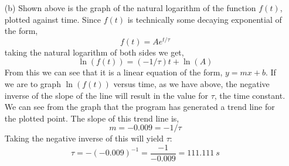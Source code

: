 \documentclass[12pt]{article}
\begin{document}
    \begin{itemize}
        \item[(b)]
            Shown above is the graph of the natural logarithm of the function $f(t)$, plotted against time. Since $f(t)$ is technically some decaying exponential of the form,
            \[
                f(t) = A e^{t / \tau}
            \]
            taking the natural logarithm of both sides we get,
            \[
                \ln(f(t)) = (-1 / \tau) t + \ln(A)
            \]
            From this we can see that it is a linear equation of the form, $y = mx + b$. If we are to graph $\ln(f(t))$ versus time, as we have above, the negative inverse of the slope of the line will result in the value for $\tau$, the time constant. We can see from the graph that the program has generated a trend line for the plotted point.  The slope of this trend line is,
            \[
                m = -0.009 = -1 / \tau
            \]
            Taking the negative inverse of this will yield $\tau$:
            \[
                \tau = -(-0.009)^{-1} = \frac{-1}{-0.009} = \boxed{111.111\ s}
            \]
    \end{itemize}
\end{document}
